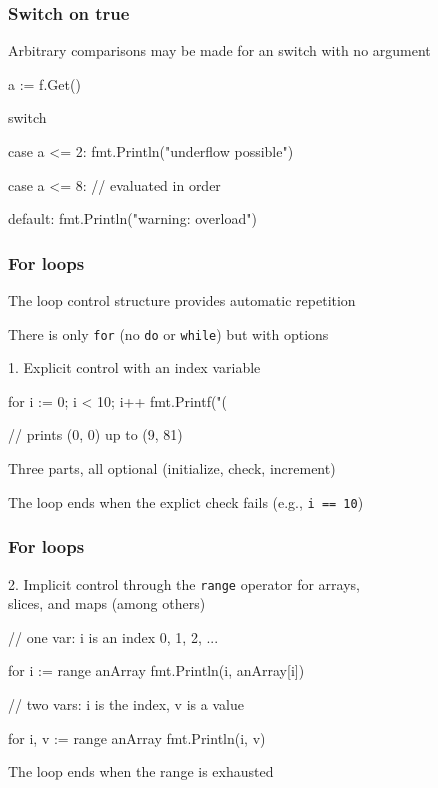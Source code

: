 \documentclass[handout,compress,t,11pt]{beamer}
\begin{document}
\begin{frame}[fragile]
    \frametitle{Switch on true}
    Arbitrary comparisons may be made for an switch with no argument \par
\begin{golang}
    a := f.Get()

    switch {
    case a <= 2:
        fmt.Println("underflow possible")

    case a <= 8:
        // evaluated in order

    default:
        fmt.Println("warning: overload") 
    }
\end{golang}
\end{frame}

\begin{frame}[fragile]
    \frametitle{For loops}
    The loop control structure provides automatic repetition \par
    \vspace{0.5\baselineskip}
    There is only \verb|for| (no \verb|do| or \:\verb|while|) but with options \par
    \vspace{\baselineskip}
    1. Explicit control with an index variable
\begin{golang}
    for i := 0; i < 10; i++ {
        fmt.Printf("(%
    }

    // prints (0, 0) up to (9, 81)
\end{golang}
    \vspace{0.5\baselineskip}
    Three parts, all optional (initialize, check, increment) \par
    \vspace{0.5\baselineskip}
    The loop ends when the explict check fails (e.g., \verb|i == 10|)
\end{frame}

\begin{frame}[fragile]
    \frametitle{For loops}
    2. Implicit control through the \verb|range| operator for arrays, \\
    slices, and maps (among others)
\begin{golang}
    // one var: i is an index 0, 1, 2, ...

    for i := range anArray {
        fmt.Println(i, anArray[i])
    }

    // two vars: i is the index, v is a value

    for i, v := range anArray {
        fmt.Println(i, v)
    }
\end{golang}
    \vspace{0.5\baselineskip}
    The loop ends when the range is exhausted
\end{frame}
\end{document}
